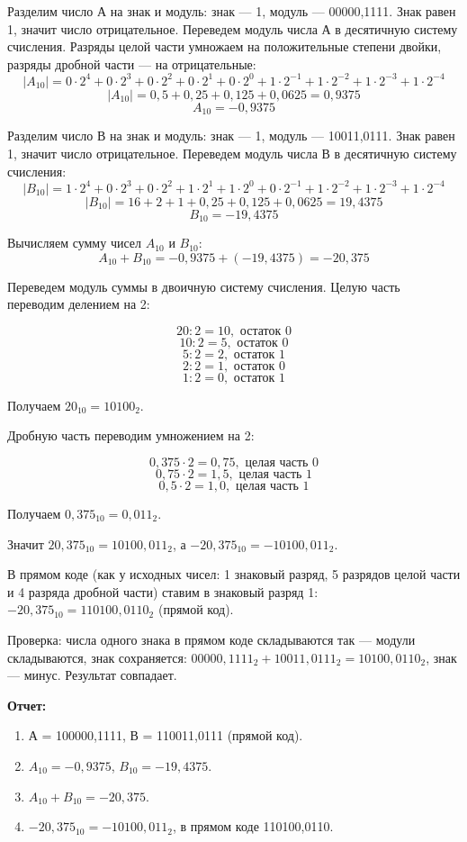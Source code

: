 \documentclass[a4paper, 12pt]{article}
\begin{document}
Разделим число А на знак и модуль: знак --- 1, модуль --- 00000,1111. Знак равен 1, значит число отрицательное.
Переведем модуль числа А в десятичную систему счисления. Разряды целой части умножаем на
положительные степени двойки, разряды дробной части --- на отрицательные:
$$|A_{10}| = 0 \cdot 2^4 + 0 \cdot 2^3 + 0 \cdot 2^2 + 0 \cdot 2^1 + 0 \cdot 2^0
+ 1 \cdot 2^{-1} + 1 \cdot 2^{-2} + 1 \cdot 2^{-3} + 1 \cdot 2^{-4}$$
$$|A_{10}| = 0{,}5 + 0{,}25 + 0{,}125 + 0{,}0625 = 0{,}9375$$
$$A_{10} = -0{,}9375$$

Разделим число В на знак и модуль: знак --- 1, модуль --- 10011,0111. Знак равен 1, значит число отрицательное.
Переведем модуль числа В в десятичную систему счисления:
$$|B_{10}| = 1 \cdot 2^4 + 0 \cdot 2^3 + 0 \cdot 2^2 + 1 \cdot 2^1 + 1 \cdot 2^0
+ 0 \cdot 2^{-1} + 1 \cdot 2^{-2} + 1 \cdot 2^{-3} + 1 \cdot 2^{-4}$$
$$|B_{10}| = 16 + 2 + 1 + 0{,}25 + 0{,}125 + 0{,}0625 = 19{,}4375$$
$$B_{10} = -19{,}4375$$

Вычисляем сумму чисел $A_{10}$ и $B_{10}$:
$$A_{10} + B_{10} = -0{,}9375 + (-19{,}4375) = -20{,}375$$

Переведем модуль суммы в двоичную систему счисления. Целую часть переводим делением на 2:

$$20 : 2 = 10, \text{ остаток } 0$$
$$10 : 2 = 5, \text{ остаток } 0$$
$$5 : 2 = 2, \text{ остаток } 1$$
$$2 : 2 = 1, \text{ остаток } 0$$
$$1 : 2 = 0, \text{ остаток } 1$$

Получаем $20_{10} = 10100_2$.

Дробную часть переводим умножением на 2:

$$0{,}375 \cdot 2 = 0{,}75, \text{ целая часть } 0$$
$$0{,}75 \cdot 2 = 1{,}5, \text{ целая часть } 1$$
$$0{,}5 \cdot 2 = 1{,}0, \text{ целая часть } 1$$

Получаем $0{,}375_{10} = 0{,}011_2$.

Значит $20{,}375_{10} = 10100{,}011_2$, а $-20{,}375_{10} = -10100{,}011_2$.

В прямом коде (как у исходных чисел: 1 знаковый разряд, 5 разрядов целой части и 4 разряда дробной части)
ставим в знаковый разряд 1: $-20{,}375_{10} = 110100{,}0110_2$ (прямой код).

Проверка: числа одного знака в прямом коде складываются так --- модули складываются, знак сохраняется:
$00000{,}1111_2 + 10011{,}0111_2 = 10100{,}0110_2$, знак --- минус. Результат совпадает.
\vspace{1cm}

\textbf{Отчет:}
\begin{enumerate}[nosep]
    \item А = 100000,1111, В = 110011,0111 (прямой код).
    \item $A_{10} = -0{,}9375$, $B_{10} = -19{,}4375$.
    \item $A_{10} + B_{10} = -20{,}375$.
    \item $-20{,}375_{10} = -10100{,}011_2$, в прямом коде 110100,0110.
\end{enumerate}
\end{document}

